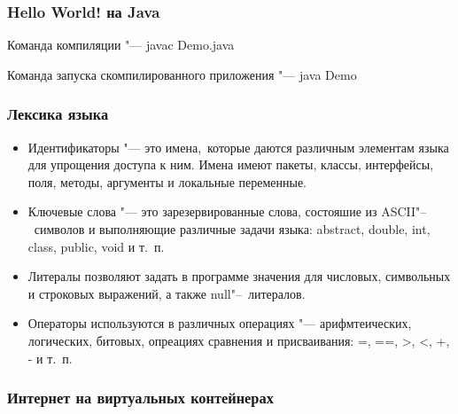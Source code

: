 \documentclass[default]{beamer}
\begin{document}
	\begin{frame}
		\frametitle{Hello World! на Java}
		\lstB
		
		\par\bigskip
		Команда компиляции "--- javac Demo.java
		
		Команда запуска скомпилированного приложения "--- java Demo
	\end{frame}
	
	\begin{frame}
	\frametitle{Лексика языка}
	
	\begin{itemize}
		\item Идентификаторы "--- это имена,~которые даются различным элементам языка
		для упрощения доступа к ним. Имена имеют пакеты, классы, интерфейсы, поля,
		методы, аргументы и локальные переменные.
		\item Ключевые слова "--- это зарезервированные слова, состояшие из
		ASCII"--~символов и выполняющие различные задачи языка: abstract, double, int,
		class, public, void и т.~п.
		\item Литералы позволяют задать в программе значения для числовых, символьных и строковых выражений, а также null"--~литералов.
		\item Операторы используются в различных операциях "--- арифмтеических, логических, битовых, опреациях сравнения и присваивания: =, ==, >, <, +, - и т.~п.
	\end{itemize}
	\end{frame}


	\begin{frame}
		\frametitle{Интернет на виртуальных контейнерах}
		\lstC
	
	\end{frame}
\end{document}
